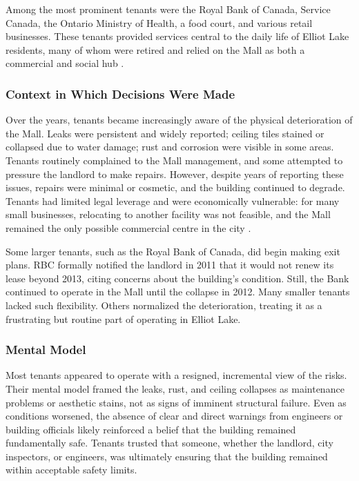 \documentclass[12pt]{article}
\begin{document}
Among the most prominent tenants were the Royal Bank of Canada, Service Canada, the Ontario Ministry of Health, a food court, and various retail businesses. These tenants provided services central to the daily life of Elliot Lake residents, many of whom were retired and relied on the Mall as both a commercial and social hub \cite[p249–251]{AlgoLakeReport1}.

\subsubsection*{Context in Which Decisions Were Made}

Over the years, tenants became increasingly aware of the physical deterioration of the Mall. Leaks were persistent and widely reported; ceiling tiles stained or collapsed due to water damage; rust and corrosion were visible in some areas. Tenants routinely complained to the Mall management, and some attempted to pressure the landlord to make repairs. However, despite years of reporting these issues, repairs were minimal or cosmetic, and the building continued to degrade. Tenants had limited legal leverage and were economically vulnerable: for many small businesses, relocating to another facility was not feasible, and the Mall remained the only possible commercial centre in the city \cite[p244–251]{AlgoLakeReport1}.

Some larger tenants, such as the Royal Bank of Canada, did begin making exit plans. RBC formally notified the landlord in 2011 that it would not renew its lease beyond 2013, citing concerns about the building's condition. Still, the Bank continued to operate in the Mall until the collapse in 2012. Many smaller tenants lacked such flexibility. Others normalized the deterioration, treating it as a frustrating but routine part of operating in Elliot Lake.

\subsubsection*{Mental Model}

Most tenants appeared to operate with a resigned, incremental view of the risks. Their mental model framed the leaks, rust, and ceiling collapses as maintenance problems or aesthetic stains, not as signs of imminent structural failure. Even as conditions worsened, the absence of clear and direct warnings from engineers or building officials likely reinforced a belief that the building remained fundamentally safe. Tenants trusted that someone, whether the landlord, city inspectors, or engineers, was ultimately ensuring that the building remained within acceptable safety limits.
\end{document}
